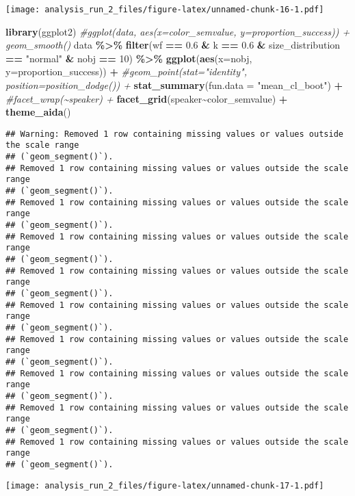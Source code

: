 \documentclass[
]{article}
\newenvironment{Shaded}{\begin{snugshade}}{\end{snugshade}}
\newcommand{\AttributeTok}[1]{\textcolor[rgb]{0.13,0.29,0.53}{#1}}
\newcommand{\CommentTok}[1]{\textcolor[rgb]{0.56,0.35,0.01}{\textit{#1}}}
\newcommand{\DecValTok}[1]{\textcolor[rgb]{0.00,0.00,0.81}{#1}}
\newcommand{\FloatTok}[1]{\textcolor[rgb]{0.00,0.00,0.81}{#1}}
\newcommand{\FunctionTok}[1]{\textcolor[rgb]{0.13,0.29,0.53}{\textbf{#1}}}
\newcommand{\NormalTok}[1]{#1}
\newcommand{\SpecialCharTok}[1]{\textcolor[rgb]{0.81,0.36,0.00}{\textbf{#1}}}
\newcommand{\StringTok}[1]{\textcolor[rgb]{0.31,0.60,0.02}{#1}}
\begin{document}
\texttt{[image: analysis\_run\_2\_files/figure-latex/unnamed-chunk-16-1.pdf]}

\begin{Shaded}
\begin{Highlighting}[]
\FunctionTok{library}\NormalTok{(ggplot2)}
\CommentTok{\#ggplot(data, aes(x=color\_semvalue, y=proportion\_success)) + geom\_smooth()}
\NormalTok{data }\SpecialCharTok{\%\textgreater{}\%} \FunctionTok{filter}\NormalTok{(wf }\SpecialCharTok{==} \FloatTok{0.6} \SpecialCharTok{\&}\NormalTok{ k }\SpecialCharTok{==} \FloatTok{0.6} \SpecialCharTok{\&}\NormalTok{ size\_distribution }\SpecialCharTok{==} \StringTok{"normal"} \SpecialCharTok{\&}\NormalTok{ nobj }\SpecialCharTok{==} \DecValTok{10}\NormalTok{) }\SpecialCharTok{\%\textgreater{}\%}
  \FunctionTok{ggplot}\NormalTok{(}\FunctionTok{aes}\NormalTok{(}\AttributeTok{x=}\NormalTok{nobj, }\AttributeTok{y=}\NormalTok{proportion\_success)) }\SpecialCharTok{+} 
  \CommentTok{\#geom\_point(stat="identity", position=position\_dodge()) + }
  \FunctionTok{stat\_summary}\NormalTok{(}\AttributeTok{fun.data =} \StringTok{"mean\_cl\_boot"}\NormalTok{) }\SpecialCharTok{+} 
  \CommentTok{\#facet\_wrap(\textasciitilde{}speaker) + }
  \FunctionTok{facet\_grid}\NormalTok{(speaker}\SpecialCharTok{\textasciitilde{}}\NormalTok{color\_semvalue) }\SpecialCharTok{+}
  \FunctionTok{theme\_aida}\NormalTok{()}
\end{Highlighting}
\end{Shaded}

\begin{verbatim}
## Warning: Removed 1 row containing missing values or values outside the scale range
## (`geom_segment()`).
## Removed 1 row containing missing values or values outside the scale range
## (`geom_segment()`).
## Removed 1 row containing missing values or values outside the scale range
## (`geom_segment()`).
## Removed 1 row containing missing values or values outside the scale range
## (`geom_segment()`).
## Removed 1 row containing missing values or values outside the scale range
## (`geom_segment()`).
## Removed 1 row containing missing values or values outside the scale range
## (`geom_segment()`).
## Removed 1 row containing missing values or values outside the scale range
## (`geom_segment()`).
## Removed 1 row containing missing values or values outside the scale range
## (`geom_segment()`).
## Removed 1 row containing missing values or values outside the scale range
## (`geom_segment()`).
## Removed 1 row containing missing values or values outside the scale range
## (`geom_segment()`).
\end{verbatim}

\texttt{[image: analysis\_run\_2\_files/figure-latex/unnamed-chunk-17-1.pdf]}
\end{document}

